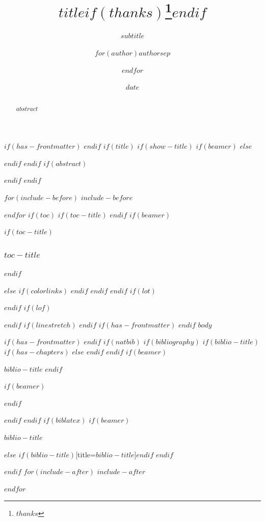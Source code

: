 \documentclass[
$if(fontsize)$
  $fontsize$,
$endif$
$if(lang)$
  $babel-lang$,
$endif$
$if(papersize)$
  $papersize$paper,
$endif$
$if(beamer)$
  ignorenonframetext,
$if(handout)$
  handout,
$endif$
$if(aspectratio)$
  aspectratio=$aspectratio$,
$endif$
$endif$
$for(classoption)$
  $classoption$$sep$,
$endfor$
]{$documentclass$}
\title{$title$$if(thanks)$\thanks{$thanks$}$endif$}
\subtitle{$subtitle$}
\author{$for(author)$$author$$sep$ \and $endfor$}
\date{$date$}
\institute{$for(institute)$$institute$$sep$ \and $endfor$}
\newif\ifbibliography
\begin{document}
$if(has-frontmatter)$
\frontmatter
$endif$
$if(title)$
$if(show-title)$
$if(beamer)$
\frame{\titlepage}
$else$
\maketitle
$endif$
$endif$
$if(abstract)$
\begin{abstract}
$abstract$
\end{abstract}
$endif$
$endif$

$for(include-before)$
$include-before$

$endfor$
$if(toc)$
$if(toc-title)$
\renewcommand*\contentsname{$toc-title$}
$endif$
$if(beamer)$
\begin{frame}
$if(toc-title)$
  \frametitle{$toc-title$}
$endif$
  \tableofcontents[hideallsubsections]
\end{frame}
$else$
{
$if(colorlinks)$
\hypersetup{linkcolor=$if(toccolor)$$toccolor$$else$$endif$}
$endif$
\setcounter{tocdepth}{$toc-depth$}
\tableofcontents
}
$endif$
$endif$
$if(lot)$
\listoftables
$endif$
$if(lof)$
\listoffigures
$endif$
$if(linestretch)$
$endif$
$if(has-frontmatter)$
\mainmatter
$endif$
$body$

$if(has-frontmatter)$
\backmatter
$endif$
$if(natbib)$
$if(bibliography)$
$if(biblio-title)$
$if(has-chapters)$
\renewcommand\bibname{$biblio-title$}
$else$
\renewcommand\refname{$biblio-title$}
$endif$
$endif$
$if(beamer)$
\begin{frame}[allowframebreaks]{$biblio-title$}
  \bibliographytrue
$endif$
  
$if(beamer)$
\end{frame}
$endif$

$endif$
$endif$
$if(biblatex)$
$if(beamer)$
\begin{frame}[allowframebreaks]{$biblio-title$}
  \bibliographytrue
  \printbibliography[heading=none]
\end{frame}
$else$
\printbibliography$if(biblio-title)$[title=$biblio-title$]$endif$
$endif$

$endif$
$for(include-after)$
$include-after$

$endfor$
\end{document}
